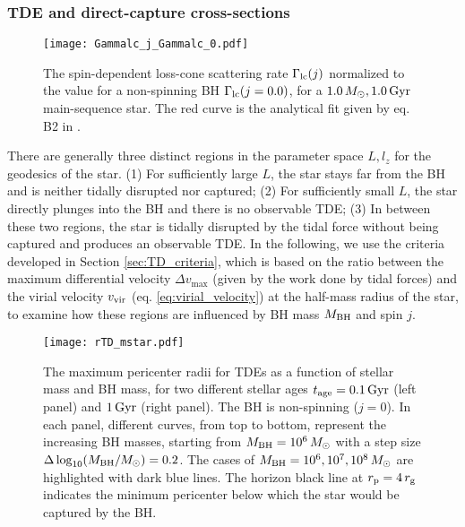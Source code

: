 \documentclass[useAMS,usenatbib]{mn2e}
\def\msun{M_{\rm \odot}}
\def\mBH{M_{\rm BH}}
\def\rg{r_{\rm g}}
\def\rp{r_{\rm p}}
\def\Gammalc{\Gamma_{\rm lc}}
\def\tage{t_{\rm age}}
\def\Gyr{{\rm Gyr}}
\begin{document}
\subsubsection{TDE and direct-capture cross-sections}

\begin{figure}
    \centering
    \texttt{[image: Gammalc\_j\_Gammalc\_0.pdf]}
    \caption{
    The spin-dependent loss-cone scattering rate $\Gammalc(j)$ normalized to the value for a non-spinning BH $\Gammalc(j=0.0)$, for a $1.0\,\msun,1.0\,\Gyr$ main-sequence star. The red curve is the analytical fit given by eq. B2 in \citet{Young1977}.
    }
    \label{fig:Gammalc_j_Gamma_lc_0}
\end{figure}

There are generally three distinct regions in the parameter space $L,l_z$ for the geodesics of the star.
(1) For sufficiently large $L$, the star stays far from the BH and is neither tidally disrupted nor captured; 
(2) For sufficiently small $L$, the star directly plunges into the BH and there is no observable TDE;
(3) In between these two regions, the star is tidally disrupted by the tidal force without being captured and produces an observable TDE.
In the following, we use the criteria developed in Section \ref{sec:TD_criteria}, which is based on the ratio between the maximum differential velocity $\Delta v_{\max}$ (given by the work done by tidal forces) and the virial velocity $v_{\rm vir}$ (eq. \ref{eq:virial_velocity}) at the half-mass radius of the star, to examine how these regions are influenced by BH mass $\mBH$ and spin $j$.


\begin{figure*}
    \centering
    \texttt{[image: rTD\_mstar.pdf]}
    \caption{
    The maximum pericenter radii for TDEs as a function of stellar mass and BH mass, for two different stellar ages $\tage=0.1\rm\, Gyr$ (left panel) and $1\rm\, Gyr$ (right panel). The BH is non-spinning ($j=0$).
    In each panel, different curves, from top to bottom, represent the increasing BH masses, starting from $\mBH=10^6\,\msun$ with a step size $\Delta \log_{10}(\mBH/\msun)=0.2$. The cases of $\mBH=10^6,10^7,10^8\,\msun$ are highlighted with dark blue lines.
    The horizon black line at $\rp=4\,\rg$ indicates the minimum pericenter below which the star would be captured by the BH.
    }
    \label{fig:rTD_mstar}
\end{figure*}
\end{document}
